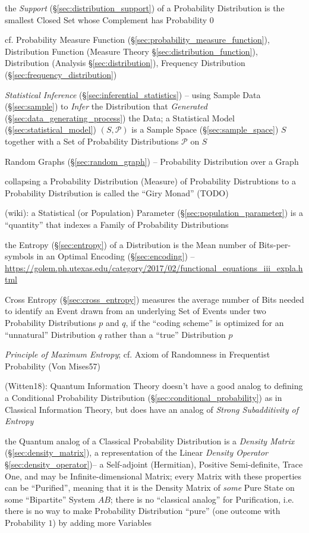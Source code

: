 the \emph{Support} (\S\ref{sec:distribution_support}) of a Probability
Distribution is the smallest Closed Set whose Complement has Probability $0$

\fist cf. Probability Measure Function
(\S\ref{sec:probability_measure_function}), Distribution Function (Measure
Theory \S\ref{sec:distribution_function}), Distribution (Analysis
\S\ref{sec:distribution}), Frequency Distribution
(\S\ref{sec:frequency_distribution})

\fist \emph{Statistical Inference} (\S\ref{sec:inferential_statistics}) -- using
Sample Data (\S\ref{sec:sample}) to \emph{Infer} the Distribution that
\emph{Generated} (\S\ref{sec:data_generating_process}) the Data; a Statistical
Model (\S\ref{sec:statistical_model}) $(S,\mathcal{P})$ is a Sample Space
(\S\ref{sec:sample_space}) $S$ together with a Set of Probability Distributions
$\mathcal{P}$ on $S$

\fist Random Graphs (\S\ref{sec:random_graph}) -- Probability Distribution over
a Graph

collapsing a Probability Distribution (Measure) of Probability Distrubtions to a
Probability Distribution is called the ``Giry Monad'' (TODO)

(wiki): a Statistical (or Population) Parameter
(\S\ref{sec:population_parameter}) is a ``quantity'' that indexes a Family of
Probability Distributions

the Entropy (\S\ref{sec:entropy}) of a Distribution is the Mean number
of Bits-per-symbols in an Optimal Encoding (\S\ref{sec:encoding}) --
\url{https://golem.ph.utexas.edu/category/2017/02/functional_equations_iii_expla.html}

Cross Entropy (\S\ref{sec:cross_entropy}) measures the average number of Bits
needed to identify an Event drawn from an underlying Set of Events under two
Probability Distributions $p$ and $q$, if the ``coding scheme'' is optimized for
an ``unnatural'' Distribution $q$ rather than a ``true'' Distribution $p$

\emph{Principle of Maximum Entropy}; cf. Axiom of Randomness in Frequentist
Probability (Von Mises57)

(Witten18): Quantum Information Theory doesn't have a good analog to defining a
Conditional Probability Distribution (\S\ref{sec:conditional_probability}) as in
Classical Information Theory, but does have an analog of \emph{Strong
  Subadditivity of Entropy}

the Quantum analog of a Classical Probability Distribution is a \emph{Density
  Matrix} (\S\ref{sec:density_matrix}), a representation of the Linear
\emph{Density Operator} \S\ref{sec:density_operator})-- a Self-adjoint
(Hermitian), Positive Semi-definite, Trace One, and may be Infinite-dimensional
Matrix; every Matrix with these properties can be ``Purified'', meaning that it
is the Density Matrix of \emph{some} Pure State on some ``Bipartite'' System
$AB$; there is no ``classical analog'' for Purification, i.e. there is no way to
make Probability Distribution ``pure'' (one outcome with Probability $1$) by
adding more Variables



